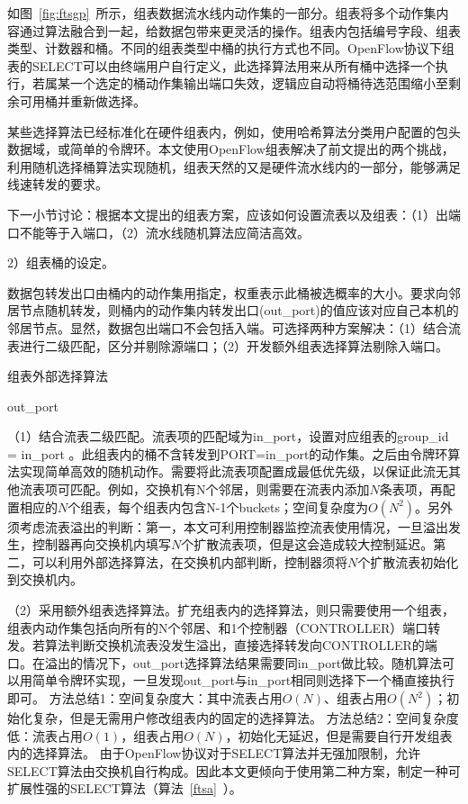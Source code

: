 如图~\ref{fig:ftsgp}~所示，组表数据流水线内动作集的一部分。组表将多个动作集内容通过算法融合到一起，给数据包带来更灵活的操作。组表内包括编号字段、组表类型、计数器和桶。不同的组表类型中桶的执行方式也不同。OpenFlow协议下组表的SELECT可以由终端用户自行定义，此选择算法用来从所有桶中选择一个执行，若属某一个选定的桶动作集输出端口失效，逻辑应自动将桶待选范围缩小至剩余可用桶并重新做选择。

某些选择算法已经标准化在硬件组表内，例如，使用哈希算法分类用户配置的包头数据域，或简单的令牌环。本文使用OpenFlow组表解决了前文提出的两个挑战，利用随机选择桶算法实现随机，组表天然的又是硬件流水线内的一部分，能够满足线速转发的要求。

下一小节讨论：根据本文提出的组表方案，应该如何设置流表以及组表：（1）出端口不能等于入端口，（2）流水线随机算法应简洁高效。


2）组表桶的设定。

数据包转发出口由桶内的动作集用指定，权重表示此桶被选概率的大小。要求向邻居节点随机转发，则桶内的动作集内转发出口(out\_port)的值应该对应自己本机的邻居节点。显然，数据包出端口不会包括入端。可选择两种方案解决：（1）结合流表进行二级匹配，区分并剔除源端口；（2）开发额外组表选择算法剔除入端口。

\begin{algorithm}[!h]
	\caption{组表外部选择算法 \label{ftsa}}
	\IncMargin{2em}
	\DontPrintSemicolon
	
	
	\Return out\_port
	
\end{algorithm}

（1）结合流表二级匹配。流表项的匹配域为in\_port，设置对应组表的group\_id = in\_port 。此组表内的桶不含转发到PORT=in\_port的动作集。之后由令牌环算法实现简单高效的随机动作。需要将此流表项配置成最低优先级，以保证此流无其他流表项可匹配。例如，交换机有N个邻居，则需要在流表内添加$ N $条表项，再配置相应的$ N $个组表，每个组表内包含N-1个buckets；空间复杂度为$O(N^2)$。另外须考虑流表溢出的判断：第一，本文可利用控制器监控流表使用情况，一旦溢出发生，控制器再向交换机内填写$ N $个扩散流表项，但是这会造成较大控制延迟。第二，可以利用外部选择算法，在交换机内部判断，控制器须将$ N $个扩散流表初始化到交换机内。

（2）采用额外组表选择算法。扩充组表内的选择算法，则只需要使用一个组表，组表内动作集包括向所有的N个邻居、和1个控制器（CONTROLLER）端口转发。若算法判断交换机流表没发生溢出，直接选择转发向CONTROLLER的端口。在溢出的情况下，out\_port选择算法结果需要同in\_port做比较。随机算法可以用简单令牌环实现，一旦发现out\_port与in\_port相同则选择下一个桶直接执行即可。
方法总结1：空间复杂度大：其中流表占用$O(N)$、组表占用$O(N^2)$；初始化复杂，但是无需用户修改组表内的固定的选择算法。
方法总结2：空间复杂度低：流表占用$O(1)$，组表占用$O(N)$，初始化无延迟，但是需要自行开发组表内的选择算法。
由于OpenFlow协议对于SELECT算法并无强加限制，允许SELECT算法由交换机自行构成。因此本文更倾向于使用第二种方案，制定一种可扩展性强的SELECT算法（算法~\ref{ftsa}~）。



